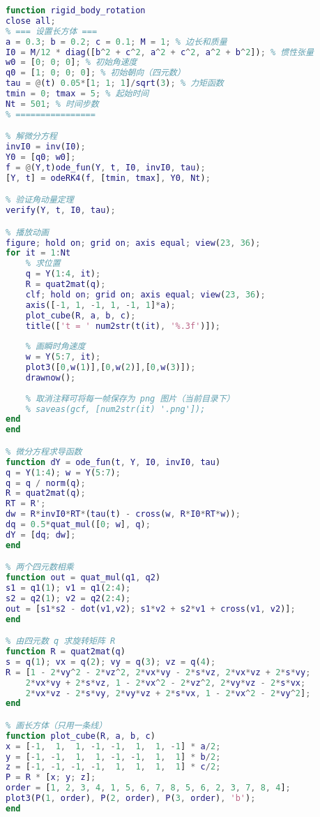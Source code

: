 \begin{lstlisting}[language=matlab, caption=rigBdRot.m]
% 刚体绕固定点转动的数值计算
function rigid_body_rotation
close all;
% === 设置长方体 ===
a = 0.3; b = 0.2; c = 0.1; M = 1; % 边长和质量
I0 = M/12 * diag([b^2 + c^2, a^2 + c^2, a^2 + b^2]); % 惯性张量
w0 = [0; 0; 0]; % 初始角速度
q0 = [1; 0; 0; 0]; % 初始朝向（四元数）
tau = @(t) 0.05*[1; 1; 1]/sqrt(3); % 力矩函数
tmin = 0; tmax = 5; % 起始时间
Nt = 501; % 时间步数
% ================

% 解微分方程
invI0 = inv(I0);
Y0 = [q0; w0];
f = @(Y,t)ode_fun(Y, t, I0, invI0, tau);
[Y, t] = odeRK4(f, [tmin, tmax], Y0, Nt);

% 验证角动量定理
verify(Y, t, I0, tau);

% 播放动画
figure; hold on; grid on; axis equal; view(23, 36);
for it = 1:Nt
    % 求位置
    q = Y(1:4, it);
    R = quat2mat(q);
    clf; hold on; grid on; axis equal; view(23, 36);
    axis([-1, 1, -1, 1, -1, 1]*a);
    plot_cube(R, a, b, c);
    title(['t = ' num2str(t(it), '%.3f')]);
    
    % 画瞬时角速度
    w = Y(5:7, it);
    plot3([0,w(1)],[0,w(2)],[0,w(3)]);
    drawnow();
    
    % 取消注释可将每一帧保存为 png 图片（当前目录下）
    % saveas(gcf, [num2str(it) '.png']);
end
end

% 微分方程求导函数
function dY = ode_fun(t, Y, I0, invI0, tau)
q = Y(1:4); w = Y(5:7);
q = q / norm(q);
R = quat2mat(q);
RT = R';
dw = R*invI0*RT*(tau(t) - cross(w, R*I0*RT*w));
dq = 0.5*quat_mul([0; w], q);
dY = [dq; dw];
end

% 两个四元数相乘
function out = quat_mul(q1, q2)
s1 = q1(1); v1 = q1(2:4);
s2 = q2(1); v2 = q2(2:4);
out = [s1*s2 - dot(v1,v2); s1*v2 + s2*v1 + cross(v1, v2)];
end

% 由四元数 q 求旋转矩阵 R
function R = quat2mat(q)
s = q(1); vx = q(2); vy = q(3); vz = q(4);
R = [1 - 2*vy^2 - 2*vz^2, 2*vx*vy - 2*s*vz, 2*vx*vz + 2*s*vy;
    2*vx*vy + 2*s*vz, 1 - 2*vx^2 - 2*vz^2, 2*vy*vz - 2*s*vx;
    2*vx*vz - 2*s*vy, 2*vy*vz + 2*s*vx, 1 - 2*vx^2 - 2*vy^2];
end

% 画长方体（只用一条线）
function plot_cube(R, a, b, c)
x = [-1,  1,  1, -1, -1,  1,  1, -1] * a/2;
y = [-1, -1,  1,  1, -1, -1,  1,  1] * b/2;
z = [-1, -1, -1, -1,  1,  1,  1,  1] * c/2;
P = R * [x; y; z];
order = [1, 2, 3, 4, 1, 5, 6, 7, 8, 5, 6, 2, 3, 7, 8, 4];
plot3(P(1, order), P(2, order), P(3, order), 'b');
end


\end{lstlisting}
